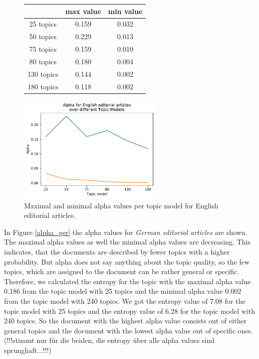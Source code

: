 \begin{figure}
	\begin{minipage}{0.5\textwidth}
		\centering
		\begin{tabular}[t]{c|cc}
			&max value & min value\\
			\hline
			25 topics&0.159&0.032\\
			50 topics&0.229&0.013\\
			75 topics&0.159&0.010\\
			80 topics&	0.180&0.004\\
			130 topics &0.144&0.002\\
			180 topics&	0.118&0.002\\
		\end{tabular}
	\end{minipage}%
	\begin{minipage}{0.5\textwidth}
		\centering
		\includegraphics[width=7cm]{gfx/Eval_IC/English_Editorial_Alpha.pdf}
	\end{minipage}
	\caption{Maximal and minimal alpha values per topic model for English editorial articles.}
	\label{alpha_eng}
\end{figure}
In Figure \ref{alpha_ger} the alpha values for \textit{German editorial articles} are shown. The maximal alpha values as well the minimal alpha values are decreasing. This indicates, that the documents are described by fewer topics with a higher probability. But alpha does not say anything about the topic quality, so the few topics, which are assigned to the document can be rather general or specific. Therefore, we calculated the entropy for the topic with the maximal alpha value 0.186 from the topic model with 25 topics and the minimal alpha value 0.002 from the topic model with 240 topics. We got the entropy value of 7.08 for the topic model with 25 topics and the entropy value of 6.28 for the topic model with 240 topics. So the document with the highest alpha value consists out of either general topics and the document with the lowest alpha value out of specific ones. 
(!!!stimmt nur für die beiden, die entropy über alle alpha values sind sprunghaft...!!!)


